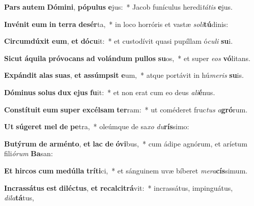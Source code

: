 \item \textbf{Pars} \textbf{au}\textbf{tem} \textbf{Dó}\textbf{mi}\textbf{ni}, \textbf{pó}\textbf{pu}\textbf{lus} \textbf{e}jus:~* Jacob funículus heredi\textit{tá}\textit{tis} \textbf{e}jus.
\item \textbf{In}\textbf{vé}\textbf{nit} \textbf{e}\textbf{um} \textbf{in} \textbf{ter}\textbf{ra} \textbf{de}\textbf{sér}ta,~* in loco horróris et vastæ \textit{so}\textit{li}\textbf{tú}dinis:
\item \textbf{Cir}\textbf{cum}\textbf{dú}\textbf{xit} \textbf{e}\textbf{um}, \textbf{et} \textbf{dó}\textbf{cu}it:~* et custodívit quasi pupíllam ó\textit{cu}\textit{li} \textbf{su}i.
\item \textbf{Sic}\textbf{ut} \textbf{á}\textbf{qui}\textbf{la} \textbf{pró}\textbf{vo}\textbf{cans} \textbf{ad} \textbf{vo}\textbf{lán}\textbf{dum} \textbf{pul}\textbf{los} \textbf{su}os,~* et super \textit{e}\textit{os} \textbf{vó}litans.
\item \textbf{Ex}\textbf{pán}\textbf{dit} \textbf{a}\textbf{las} \textbf{su}\textbf{as}, \textbf{et} \textbf{as}\textbf{súmp}\textbf{sit} \textbf{e}um,~* atque portávit in hú\textit{me}\textit{ris} \textbf{su}is.
\item \textbf{Dó}\textbf{mi}\textbf{nus} \textbf{so}\textbf{lus} \textbf{dux} \textbf{e}\textbf{jus} \textbf{fu}it:~* et non erat cum eo deus \textit{a}\textit{li}\textbf{é}nus.
\item \textbf{Con}\textbf{stí}\textbf{tu}\textbf{it} \textbf{e}\textbf{um} \textbf{su}\textbf{per} \textbf{ex}\textbf{cél}\textbf{sam} \textbf{ter}ram:~* ut coméderet fruc\textit{tus} \textit{a}\textbf{gró}rum.
\item \textbf{Ut} \textbf{sú}\textbf{ge}\textbf{ret} \textbf{mel} \textbf{de} \textbf{pe}tra,~* oleúmque de sa\textit{xo} \textit{du}\textbf{rís}simo:
\item \textbf{Bu}\textbf{tý}\textbf{rum} \textbf{de} \textbf{ar}\textbf{mén}\textbf{to}, \textbf{et} \textbf{lac} \textbf{de} \textbf{ó}\textbf{vi}bus,~* cum ádipe agnórum, et aríetum fili\textit{ó}\textit{rum} \textbf{Ba}san:
\item \textbf{Et} \textbf{hir}\textbf{cos} \textbf{cum} \textbf{me}\textbf{dúl}\textbf{la} \textbf{trí}\textbf{ti}ci,~* et sánguinem uvæ bíberet \textit{me}\textit{ra}\textbf{cís}simum.
\item \textbf{In}\textbf{cras}\textbf{sá}\textbf{tus} \textbf{est} \textbf{di}\textbf{léc}\textbf{tus}, \textbf{et} \textbf{re}\textbf{cal}\textbf{ci}\textbf{trá}vit:~* incrassátus, impinguátus, \textit{di}\textit{la}\textbf{tá}tus,
